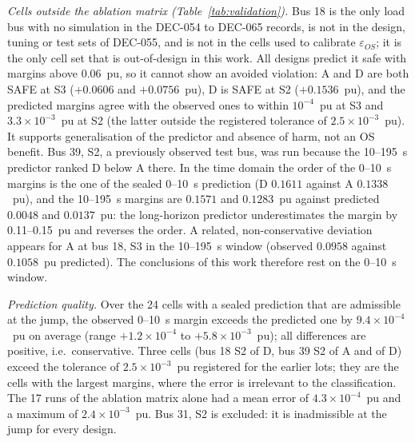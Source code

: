 \emph{Cells outside the ablation matrix (Table~\ref{tab:validation}).} Bus 18 is the only load bus with no simulation in the DEC-054 to DEC-065 records, is not in the design, tuning or test sets of DEC-055, and is not in the cells used to calibrate $\varepsilon_{OS}$; it is the only cell set that is out-of-design in this work. All designs predict it safe with margins above 0.06~pu, so it cannot show an avoided violation: A and D are both SAFE at S3 ($+0.0606$ and $+0.0756$~pu), D is SAFE at S2 ($+0.1536$~pu), and the predicted margins agree with the observed ones to within $10^{-4}$~pu at S3 and $3.3\times10^{-3}$~pu at S2 (the latter outside the registered tolerance of $2.5\times10^{-3}$~pu). It supports generalisation of the predictor and absence of harm, not an OS benefit. Bus 39, S2, a previously observed test bus, was run because the 10--195~s predictor ranked D below A there. In the time domain the order of the 0--10~s margins is the one of the sealed 0--10~s prediction (D $0.1611$ against A $0.1338$~pu), and the 10--195~s margins are $0.1571$ and $0.1283$~pu against predicted $0.0048$ and $0.0137$~pu: the long-horizon predictor underestimates the margin by 0.11--0.15~pu and reverses the order. A related, non-conservative deviation appears for A at bus 18, S3 in the 10--195~s window (observed $0.0958$ against $0.1058$~pu predicted). The conclusions of this work therefore rest on the 0--10~s window.

\emph{Prediction quality.} Over the 24 cells with a sealed prediction that are admissible at the jump, the observed 0--10~s margin exceeds the predicted one by $9.4\times10^{-4}$~pu on average (range $+1.2\times10^{-4}$ to $+5.8\times10^{-3}$~pu); all differences are positive, i.e.\ conservative. Three cells (bus 18 S2 of D, bus 39 S2 of A and of D) exceed the tolerance of $2.5\times10^{-3}$~pu registered for the earlier lots; they are the cells with the largest margins, where the error is irrelevant to the classification. The 17 runs of the ablation matrix alone had a mean error of $4.3\times10^{-4}$~pu and a maximum of $2.4\times10^{-3}$~pu. Bus 31, S2 is excluded: it is inadmissible at the jump for every design.

